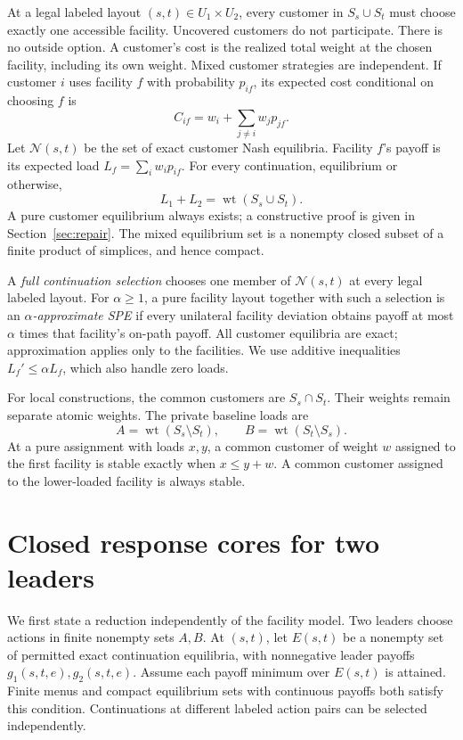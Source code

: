 \documentclass[11pt]{article}
\theoremstyle{definition}
\theoremstyle{remark}
\newcommand{\NE}{\mathcal N}
\newcommand{\wt}{\operatorname{wt}}
\newcommand{\Uone}{U_1}
\newcommand{\Utwo}{U_2}
\begin{document}
At a legal labeled layout $(s,t)\in\Uone\times\Utwo$, every customer in $S_s\cup S_t$ must choose exactly one accessible facility. Uncovered customers do not participate. There is no outside option. A customer's cost is the realized total weight at the chosen facility, including its own weight. Mixed customer strategies are independent. If customer $i$ uses facility $f$ with probability $p_{if}$, its expected cost conditional on choosing $f$ is
\begin{equation}\label{eq:conditional}
 C_{if}=w_i+\sum_{j\ne i}w_jp_{jf}.
\end{equation}
Let $\NE(s,t)$ be the set of exact customer Nash equilibria. Facility $f$'s payoff is its expected load $L_f=\sum_iw_ip_{if}$. For every continuation, equilibrium or otherwise,
\begin{equation}\label{eq:conservation}
 L_1+L_2=\wt(S_s\cup S_t).
\end{equation}
A pure customer equilibrium always exists; a constructive proof is given in Section~\ref{sec:repair}. The mixed equilibrium set is a nonempty closed subset of a finite product of simplices, and hence compact.

A \emph{full continuation selection} chooses one member of $\NE(s,t)$ at every legal labeled layout. For $\alpha\ge1$, a pure facility layout together with such a selection is an \emph{$\alpha$-approximate SPE} if every unilateral facility deviation obtains payoff at most $\alpha$ times that facility's on-path payoff. All customer equilibria are exact; approximation applies only to the facilities. We use additive inequalities $L_f'\le\alpha L_f$, which also handle zero loads.

For local constructions, the common customers are $S_s\cap S_t$. Their weights remain separate atomic weights. The private baseline loads are
\[
 A=\wt(S_s\setminus S_t),\qquad B=\wt(S_t\setminus S_s).
\]
At a pure assignment with loads $x,y$, a common customer of weight $w$ assigned to the first facility is stable exactly when $x\le y+w$. A common customer assigned to the lower-loaded facility is always stable.

\section{Closed response cores for two leaders}\label{sec:core}

We first state a reduction independently of the facility model. Two leaders choose actions in finite nonempty sets $A,B$. At $(s,t)$, let $E(s,t)$ be a nonempty set of permitted exact continuation equilibria, with nonnegative leader payoffs $g_1(s,t,e),g_2(s,t,e)$. Assume each payoff minimum over $E(s,t)$ is attained. Finite menus and compact equilibrium sets with continuous payoffs both satisfy this condition. Continuations at different labeled action pairs can be selected independently.
\end{document}
